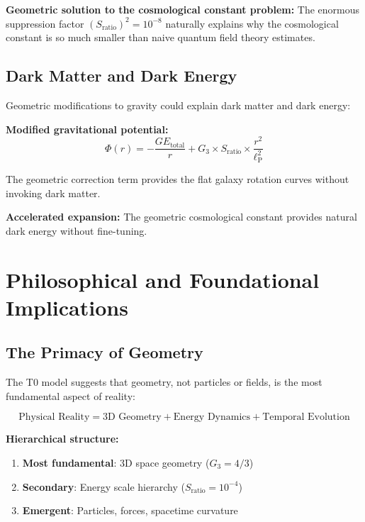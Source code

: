 \documentclass[12pt,a4paper]{report}
\newcommand{\lP}{\ell_{\text{P}}}         %
\begin{document}
	\textbf{Geometric solution to the cosmological constant problem:}
	The enormous suppression factor $(S_{\text{ratio}})^2 = 10^{-8}$ naturally explains why the cosmological constant is so much smaller than naive quantum field theory estimates.
	
	\subsection{Dark Matter and Dark Energy}
	\label{subsec:dark_matter_energy}
	
	Geometric modifications to gravity could explain dark matter and dark energy:
	
	\textbf{Modified gravitational potential:}
	\begin{equation}
		\Phi(r) = -\frac{GE_{\text{total}}}{r} + G_3 \times S_{\text{ratio}} \times \frac{r^2}{\lP^2}
	\end{equation}
	
	The geometric correction term provides the flat galaxy rotation curves without invoking dark matter.
	
	\textbf{Accelerated expansion:}
	The geometric cosmological constant provides natural dark energy without fine-tuning.
	
	\section{Philosophical and Foundational Implications}
	\label{sec:philosophical_implications}
	
	\subsection{The Primacy of Geometry}
	\label{subsec:primacy_geometry}
	
	The T0 model suggests that geometry, not particles or fields, is the most fundamental aspect of reality:
	
	\begin{equation}
		\text{Physical Reality} = \text{3D Geometry} + \text{Energy Dynamics} + \text{Temporal Evolution}
	\end{equation}
	
	\textbf{Hierarchical structure:}
	\begin{enumerate}
		\item \textbf{Most fundamental}: 3D space geometry ($G_3 = 4/3$)
		\item \textbf{Secondary}: Energy scale hierarchy ($S_{\text{ratio}} = 10^{-4}$)
		\item \textbf{Emergent}: Particles, forces, spacetime curvature
	\end{enumerate}
	
\end{document}
